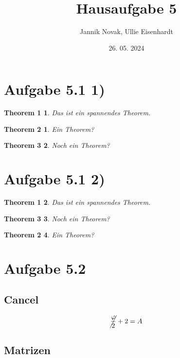 \documentclass{article}
\title{Hausaufgabe 5}
\author{Jannik Novak, Ullie Eisenhardt}
\date{26. 05. 2024}
\newtheorem{th1}{Theorem 1}[section]
\newtheorem{th2}{Theorem 2}
\newtheorem{th3}[th2]{Theorem 3}
\begin{document}
\maketitle

\clearpage

\tableofcontents

\clearpage

\section{Aufgabe 5.1 1)}

\begin{th1}
Das ist ein spannendes Theorem.
\end{th1}

\begin{th2}
Ein Theorem? 
\end{th2}

\begin{th3}
Noch ein Theorem?
\end{th3}

\section{Aufgabe 5.1 2)}

\begin{th1}
Das ist ein spannendes Theorem.
\end{th1}

\begin{th3}
Noch ein Theorem?
\end{th3}

\begin{th2}
Ein Theorem? 
\end{th2}

\section{Aufgabe 5.2}

\subsection{Cancel}

%
\begin{equation*}
    \cancel{ \dfrac{\varphi}{2} }  + 2 = A
\end{equation*}
%

\subsection{Matrizen}
\end{document}
